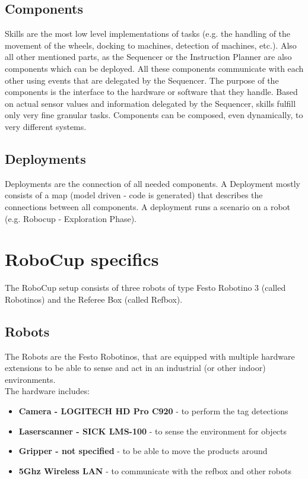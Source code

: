 \subsection{Components}
Skills are the most low level implementations of tasks (e.g. the handling of the movement of the wheels, docking to machines, detection of machines, etc.).
Also all other mentioned parts, as the Sequencer or the Instruction Planner are also components which can be deployed.
All these components communicate with each other using events that are delegated by the Sequencer.
The purpose of the components is the interface to the hardware or software that they handle.
Based on actual sensor values and information delegated by the Sequencer, skills fulfill only very fine granular tasks. Components can be composed, even dynamically, to very different systems.

\subsection{Deployments}
\label{subsec:Deployments}
Deployments are the connection of all needed components.
A Deployment mostly consists of a map (model driven - code is generated) that describes the connections between all components.
A deployment runs a scenario on a robot (e.g. Robocup - Exploration Phase).

\section{RoboCup specifics}
The RoboCup setup consists of three robots of type Festo Robotino 3 (called Robotinos) and the Referee Box (called Refbox).

\subsection{Robots}
The Robots are the Festo Robotinos, that are equipped with multiple hardware extensions to be able to sense and act
in an industrial (or other indoor) environments.\\
The hardware includes:
\begin{itemize}
    \item \textbf{Camera - LOGITECH HD Pro C920} - to perform the tag detections
    \item \textbf{Laserscanner - SICK LMS-100} - to sense the environment for objects
    \item \textbf{Gripper -  not specified} - to be able to move the products around%
    \item \textbf{5Ghz Wireless LAN} - to communicate with the refbox and other robots
\end{itemize}

